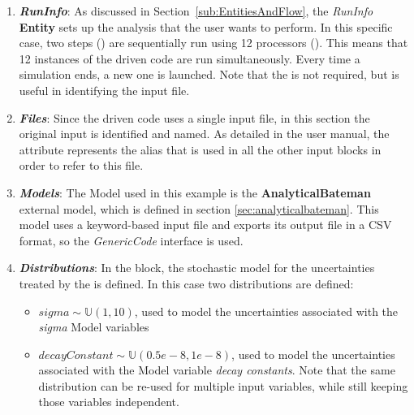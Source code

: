 \begin{enumerate}
   \item \textbf{\textit{RunInfo}}:
     As discussed in Section~\ref{sub:EntitiesAndFlow}, the \textit{RunInfo} \textbf{Entity} sets up the analysis
     that the user wants to perform. In this specific case, two steps () are sequentially run
     using 12 processors (). This means that
     12 instances of the driven code are run simultaneously. Every time a simulation ends, a new one is launched.
     Note that the  is not required, but is useful in identifying the input file.
   \item \textbf{\textit{Files}}:
     Since the driven code uses a single input file, in this section the original input is identified and
     named. As detailed in the user manual, the attribute  represents the alias that is used in
     all the other input blocks in order to refer to this file.
   \item \textbf{\textit{Models}}:
     The Model used in this example is the
     \textbf{AnalyticalBateman} external model, which is defined in section \ref{sec:analyticalbateman}.  This model uses a keyword-based input file
     and exports its output file in a CSV format, so the \textit{GenericCode} interface is used.
   \item \textbf{\textit{Distributions}}:
     In the  block, the stochastic model for the uncertainties treated by the
      is defined. In this case two distributions are defined:
     \begin{itemize}
      \item $sigma \sim \mathbb{U}(1,10)$, used to model the uncertainties
        associated with the \textit{sigma} Model variables
      \item  $decayConstant \sim \mathbb{U}(0.5e-8,1e-8)$,  used to
        model the uncertainties associated with the Model variable \textit{decay constants}.  Note that the
        same distribution can be re-used for multiple input variables, while still keeping those variables
        independent.

\end{itemize}
\end{enumerate}
